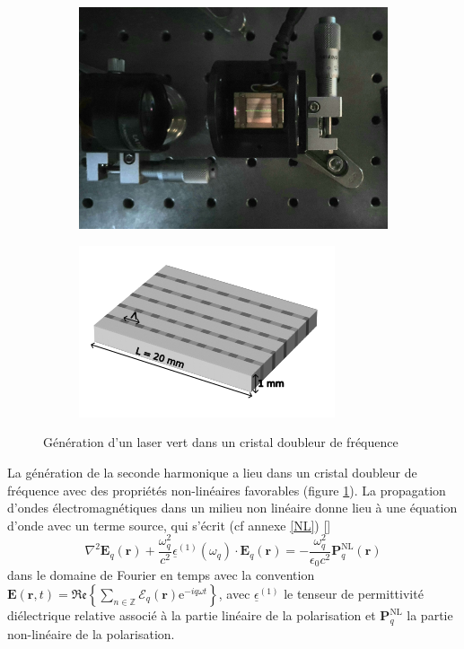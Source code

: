 \documentclass[11pt,a4paper] { article}
\newcommand{\ncite}[1]{[\citenum{#1}]}
\newcommand{\e}[1]{\text{e}^{#1}}
\newcommand{\mathsc}[1]{\mathrm{\scriptscriptstyle {#1}}}
\renewcommand{\v}[1]{\mathbf{#1}}
\newcommand{\tens}[1]{\underline{#1}}
\begin{document}
\begin{figure}[h]
\centering
\begin{subfigure}{0.45\textwidth}
	\includegraphics[width=\textwidth]{./img/cristal clair.jpg}
\end{subfigure}
\begin{subfigure}{0.5\textwidth}
	\includegraphics[width=\textwidth]{./img/cristal.png}
\end{subfigure}
\caption{Génération d'un laser vert dans un cristal doubleur de fréquence}
\label{fig:cristal}
\end{figure}

La génération de la seconde harmonique a lieu dans un cristal doubleur de fréquence avec des propriétés non-linéaires favorables (figure \ref{fig:cristal}).
La propagation d'ondes électromagnétiques dans un milieu non linéaire donne lieu à une équation d'onde avec un terme source, qui s'écrit (cf annexe \ref{NL}) \ncite{boyd,joffre}
\[ \nabla^2 \v E_q(\v r) + \frac{\omega_q^2}{c^2}\tens\epsilon^{(1)}(\omega_q)\cdot \v E_q(\v r) = - \frac{\omega_q^2}{\epsilon_0 c^2} \v P^\mathsc{NL}_q(\v r) \]
dans le domaine de Fourier en temps avec la convention $\v E(\v r, t) = \mathfrak{Re} \left\{ \sum_{n \in \mathbb Z} \v {\boldsymbol{\mathcal E}}_q (\v r) \e{-i q \omega t} \right\}$,
avec $\tens \epsilon^{(1)}$ le tenseur de permittivité diélectrique relative associé à la partie linéaire de la polarisation et $\v P^\mathsc{NL}_q$ la partie non-linéaire de la polarisation.
\end{document}
